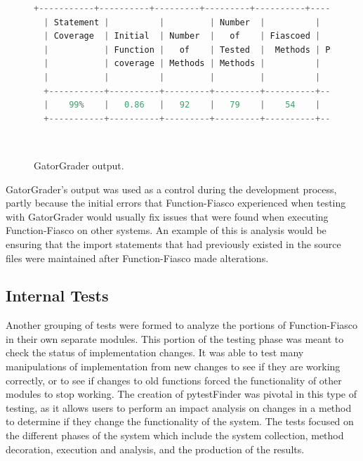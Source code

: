 \begin{figure}[H]
\begin{lstlisting}[language = Python, frame = none,  basicstyle=\tiny]
  +-----------+----------+---------+---------+----------+---------------+---------+----------+
  | Statement |          |         | Number  |          |    Number     | Number  |          |
  | Coverage  | Initial  | Number  |   of    | Fiascoed |      of       |   of    | Updated  |
  |           | Function |   of    | Tested  |  Methods | Pseudo-tested |  Truly  | Coverage |
  |           | coverage | Methods | Methods |          |    Methods    | Tested  |          |
  |           |          |         |         |          |               | Methods |          |
  +-----------+----------+---------+---------+----------+---------------+---------+----------+
  |    99%    |   0.86   |   92    |   79    |    54    |      30       |   49    |   0.53   |
  +-----------+----------+---------+---------+----------+---------------+---------+----------+
\end{lstlisting}
\caption{GatorGrader output.}~\label{gatorOutput}
\end{figure}

GatorGrader's output was used as a control during the development process, partly because the initial errors that Function-Fiasco experienced when testing with GatorGrader would usually fix issues that were found when executing Function-Fiasco on other systems. An example of this is analysis would be ensuring that the import statements that had previously existed in the source files were maintained after Function-Fiasco made alterations.


\subsection{Internal Tests}

Another grouping of tests were formed to analyze the portions of Function-Fiasco in their own separate modules. This portion of the testing phase was meant to check the status of implementation changes. It was able to test many manipulations of implementation from new changes to see if they are working correctly, or to see if changes to old functions forced the functionality of other modules to stop working. The creation of pytestFinder was pivotal in this type of testing, as it allows users to perform an impact analysis on changes in a method to determine if they change the functionality of the system. The tests focused on the different phases of the system which include the system collection, method decoration, execution and analysis, and the production of the results.

